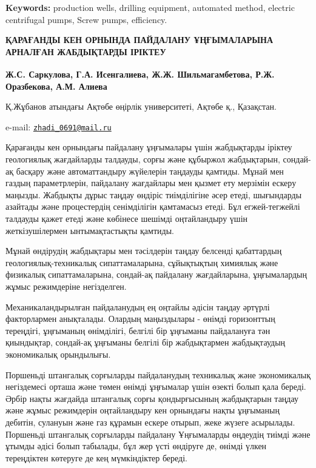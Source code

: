 {\bfseries Keywords:} production wells, drilling equipment, automated
method, electric centrifugal pumps, Screw pumps, efficiency.

\begin{articleheader}
{\bfseries ҚАРАҒАНДЫ КЕН ОРНЫНДА ПАЙДАЛАНУ ҰҢҒЫМАЛАРЫНА АРНАЛҒАН
ЖАБДЫҚТАРДЫ ІРІКТЕУ}

{\bfseries
Ж.С. Саркулова\textsuperscript{\envelope },
Г.А. Исенгалиева,
Ж.Ж. Шильмагамбетова,
Р.Ж. Оразбекова,
А.М. Алиева
}
\end{articleheader}

\begin{affiliation}
Қ.Жұбанов атындағы Ақтөбе өңірлік университеті, Ақтөбе қ., Қазақстан.

e-mail: \href{mailto:zhadi\_0691@mail.ru}{\nolinkurl{zhadi\_0691@mail.ru}}
\end{affiliation}

Қарағанды кен орнындағы пайдалану ұңғымалары үшін жабдықтарды іріктеу
геологиялық жағдайларды талдауды, сорғы және құбыржол жабдықтарын,
сондай-ақ басқару және автоматтандыру жүйелерін таңдауды қамтиды. Мұнай
мен газдың параметрлерін, пайдалану жағдайлары мен қызмет ету мерзімін
ескеру маңызды. Жабдықты дұрыс таңдау өндіріс тиімділігіне әсер етеді,
шығындарды азайтады және процестердің сенімділігін қамтамасыз етеді. Бұл
егжей-тегжейлі талдауды қажет етеді және көбінесе шешімді оңтайландыру
үшін жеткізушілермен ынтымақтастықты қамтиды.

Мұнай өндірудің жабдықтары мен тәсілдерін таңдау белсенді қабаттардың
геологиялық-техникалық сипаттамаларына, сұйықтықтың химиялық және
физикалық сипаттамаларына, сондай-ақ пайдалану жағдайларына,
ұңғымалардың жұмыс режимдеріне негізделген.

Механикаландырылған пайдаланудың ең оңтайлы әдісін таңдау әртүрлі
факторлармен анықталады. Олардың маңыздылары - өнімді горизонттың
тереңдігі, ұңғыманың өнімділігі, белгілі бір ұңғыманы пайдалануға тән
қиындықтар, сондай-ақ ұңғыманы белгілі бір жабдықтармен жабдықтаудың
экономикалық орындылығы.

Поршеньді штангалық сорғыларды пайдаланудың техникалық және экономикалық
негіздемесі орташа және төмен өнімді ұңғымалар үшін өзекті болып қала
береді. Әрбір нақты жағдайда штангалық сорғы қондырғысының жабдықтарын
таңдау және жұмыс режимдерін оңтайландыру кен орнындағы нақты ұңғыманың
дебитін, сулануын және газ құрамын ескере отырып, жеке жүзеге асырылады.
Поршеньді штангалық сорғыларды пайдалану Ұңғымаларды өңдеудің тиімді
және ұтымды әдісі болып табылады, бұл жер үсті өндіруге де, өнімді үлкен
тереңдіктен көтеруге де кең мүмкіндіктер береді.

